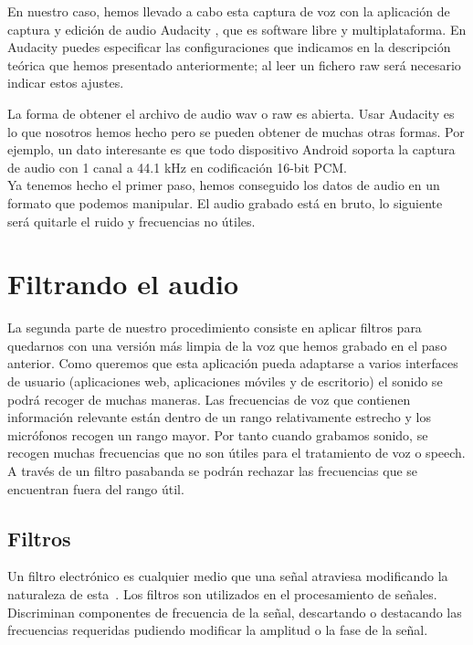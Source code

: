 En nuestro caso, hemos llevado a cabo esta captura de voz con la aplicación de captura y edición de audio Audacity \cite{REF} %
, que es software libre y multiplataforma. En Audacity puedes especificar las configuraciones que indicamos en la descripción teórica que hemos presentado anteriormente; al leer un fichero raw será necesario indicar estos ajustes.

La forma de obtener el archivo de audio wav o raw es abierta. Usar Audacity es lo que nosotros hemos hecho pero se pueden obtener de muchas otras formas. Por ejemplo, un dato interesante es que todo dispositivo Android soporta la captura de audio con 1 canal a 44.1 kHz en codificación 16-bit PCM.\\

Ya tenemos hecho el primer paso, hemos conseguido los datos de audio en un formato que podemos manipular. El audio grabado está en bruto, lo siguiente será quitarle el ruido y frecuencias no útiles.


\section{Filtrando el audio}

La segunda parte de nuestro procedimiento consiste en aplicar filtros para quedarnos con una versión más limpia de la voz que hemos grabado en el paso anterior. Como queremos que esta aplicación pueda adaptarse a varios interfaces de usuario (aplicaciones web, aplicaciones móviles y de escritorio) el sonido se podrá recoger de muchas maneras. Las frecuencias de voz que contienen información relevante están dentro de un rango relativamente estrecho y los micrófonos recogen un rango mayor. Por tanto cuando grabamos sonido, se recogen muchas frecuencias que no son útiles para el tratamiento de voz o speech. A través de un filtro pasabanda se podrán rechazar las frecuencias que se encuentran fuera del rango útil.

\subsection{Filtros}
 
Un filtro electrónico es cualquier medio que una señal atraviesa modificando la naturaleza de esta~. Los filtros son utilizados en el procesamiento de señales. Discriminan componentes de frecuencia de la señal, descartando o destacando las frecuencias requeridas pudiendo modificar la amplitud o la fase de la señal. \\%

